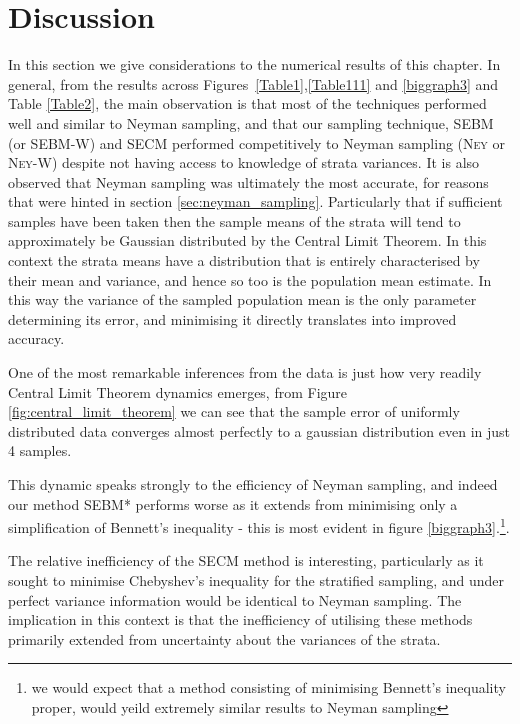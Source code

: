 \section{Discussion}
\label{sec:discussion}

In this section we give considerations to the numerical results of this chapter.
In general, from the results across Figures~\ref{Table1},\ref{Table111} and \ref{biggraph3} and Table \ref{Table2}, the main observation is that most of the techniques performed well and similar to Neyman sampling, and that our sampling technique, SEBM (or SEBM-W) and SECM performed competitively to Neyman sampling (\textsc{Ney} or \textsc{Ney-W}) despite not having access to knowledge of strata variances.
It is also observed that Neyman sampling was ultimately the most accurate, for reasons that were hinted in section \ref{sec:neyman_sampling}.
Particularly that if sufficient samples have been taken then the sample means of the strata will tend to approximately be Gaussian distributed by the Central Limit Theorem.
In this context the strata means have a distribution that is entirely characterised by their mean and variance, and hence so too is the population mean estimate.
In this way the variance of the sampled population mean is the only parameter determining its error, and minimising it directly translates into improved accuracy.

One of the most remarkable inferences from the data is just how very readily Central Limit Theorem dynamics emerges, from Figure \ref{fig:central_limit_theorem} we can see that the sample error of uniformly distributed data converges almost perfectly to a gaussian distribution even in just 4 samples.


This dynamic speaks strongly to the efficiency of Neyman sampling, and indeed our method SEBM* performs worse as it extends from minimising only a simplification of Bennett's inequality - this is most evident in figure \ref{biggraph3}.\footnote{we would expect that a method consisting of minimising Bennett's inequality proper, would yeild extremely similar results to Neyman sampling}.

The relative inefficiency of the SECM method is interesting, particularly as it sought to minimise Chebyshev's inequality for the stratified sampling, and under perfect variance information would be identical to Neyman sampling.
The implication in this context is that the inefficiency of utilising these methods primarily extended from uncertainty about the variances of the strata.

